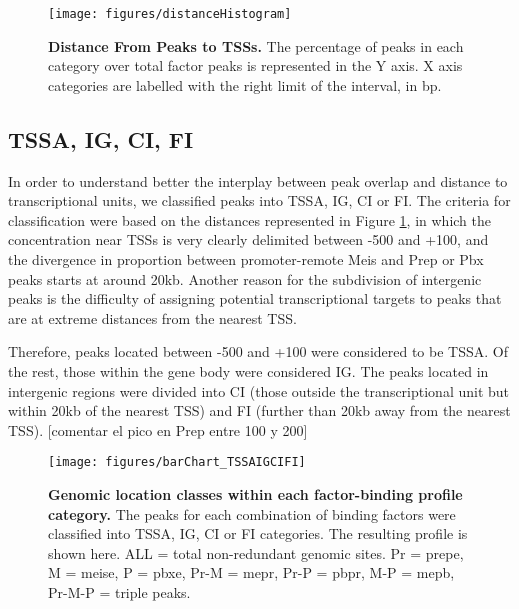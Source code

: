\begin{figure}[]
  
  \centering
  \label{fig:distanceHistogram}
  \texttt{[image: figures/distanceHistogram]}
  \caption[Distance From Peaks to \ac{TSS}s]{\textbf{Distance From Peaks to \ac{TSS}s.} The percentage of peaks in each category over total factor peaks is represented in the Y axis. X axis categories are labelled with the right limit of the interval, in \ac{bp}.}
\end{figure}




\subsection{TSSA, IG, CI, FI}

In order to understand better the interplay between peak overlap and distance to transcriptional units, we classified peaks into \ac{TSSA}, \ac{IG}, \ac{CI} or \ac{FI}. The criteria for classification were based on the  distances represented in Figure \ref{fig:distanceHistogram}, in which the concentration near \acp{TSS} is very clearly delimited between -500 and +100, and the divergence in proportion between promoter-remote Meis and Prep or Pbx peaks starts at around 20kb. Another reason for the subdivision of intergenic peaks is the difficulty of assigning potential transcriptional targets to peaks that are at extreme distances from the nearest \ac{TSS}.

Therefore, peaks located between -500 and +100 were considered to be \ac{TSSA}. Of the rest, those within the gene body were considered \ac{IG}. The peaks located in intergenic regions were divided into \ac{CI} (those outside the transcriptional unit but within 20kb of the nearest \ac{TSS}) and \ac{FI} (further than 20kb away from the nearest \ac{TSS}). 
[comentar el pico en Prep entre 100 y 200]

\begin{figure}[]
  
  \centering
  \label{fig:distanceBarChart}
  \texttt{[image: figures/barChart\_TSSAIGCIFI]}
  \caption[Genomic location classes within each factor-binding profile category]{\textbf{Genomic location classes within each factor-binding profile category.} The peaks for each combination of binding factors were classified into \ac{TSSA}, \ac{IG}, \ac{CI} or \ac{FI} categories. The resulting profile is shown here. ALL = total non-redundant genomic sites. Pr = \ac{prepe}, M = \ac{meise}, P = \ac{pbxe}, Pr-M = \ac{mepr}, Pr-P = \ac{pbpr}, M-P = \ac{mepb}, Pr-M-P = triple peaks.}
\end{figure}

